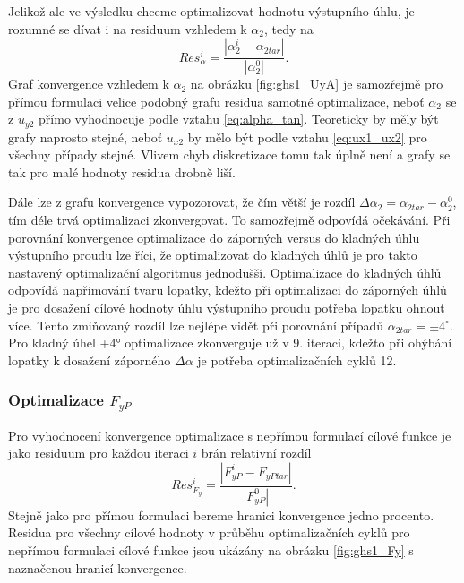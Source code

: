 Jelikož ale ve výsledku chceme optimalizovat hodnotu výstupního úhlu, je rozumné se dívat i na residuum vzhledem k $ \alpha_2 $, tedy na 
\begin{equation}\label{eq:res_alpha}
Res_{\alpha}^i=\dfrac{|\alpha_{2}^i-\alpha_{2tar}|}{|\alpha_{2}^0|}.
\end{equation}
Graf konvergence vzhledem k $ \alpha_{2} $ na obrázku \ref{fig:ghs1_UyA} je samozřejmě pro přímou formulaci velice podobný grafu residua samotné optimalizace, neboť $ \alpha_2 $ se z $ u_{y2} $ přímo vyhodnocuje podle vztahu \ref{eq:alpha_tan}. Teoreticky by měly být grafy naprosto stejné, neboť $ u_{x2} $ by mělo být podle vztahu \ref{eq:ux1_ux2} pro všechny případy stejné. Vlivem chyb diskretizace tomu tak úplně není a grafy se tak pro malé hodnoty residua drobně liší.

Dále lze z grafu konvergence vypozorovat, že čím větší je rozdíl $ \Delta \alpha_{2} = \alpha_{2tar} - \alpha_{2}^{0}$, tím déle trvá optimalizaci zkonvergovat. To samozřejmě odpovídá očekávání. Při porovnání konvergence optimalizace do záporných versus do kladných úhlu výstupního proudu lze říci, že optimalizovat do kladných úhlů je pro takto nastavený optimalizační algoritmus jednodušší. Optimalizace do kladných úhlů odpovídá napřimování tvaru lopatky, kdežto při optimalizaci do záporných úhlů je pro dosažení cílové hodnoty úhlu výstupního proudu potřeba lopatku ohnout více. Tento zmiňovaný rozdíl lze nejlépe vidět při porovnání případů $ \alpha_{2tar}=\pm 4^{\circ} $. Pro kladný úhel +4° optimalizace zkonverguje už v 9. iteraci, kdežto při ohýbání lopatky k dosažení záporného $ \Delta\alpha $ je potřeba optimalizačních cyklů 12.


\subsubsection{Optimalizace $ F_{yP} $}

Pro vyhodnocení konvergence optimalizace s nepřímou formulací cílové funkce je jako residuum pro každou iteraci $ i $ brán relativní rozdíl
\begin{equation}\label{eq:res_fy}
Res_{F_{y}}^i=\dfrac{|F_{yP}^i-F_{yPtar}|}{|F_{yP}^0|}.
\end{equation}
Stejně jako pro přímou formulaci bereme hranici konvergence jedno procento. Residua pro všechny cílové hodnoty v průběhu optimalizačních cyklů pro nepřímou formulaci cílové funkce jsou ukázány na obrázku \ref{fig:ghs1_Fy} s naznačenou hranicí konvergence. 

